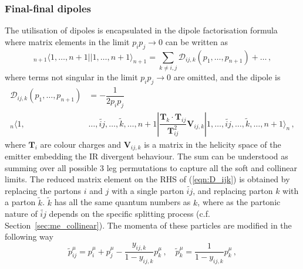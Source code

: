 \documentclass[main.tex]{subfiles}
\begin{document}
    \subsubsection{Final-final dipoles}
        The utilisation of dipoles is encapsulated in the
        dipole factorisation formula where matrix elements in the limit
        $p_{i}p_{j} \rightarrow 0$ can be written as
        \begin{equation}\label{eqn:FF_factorisation}
            {}_{n+1} \langle 1, \ldots, n+1 | | 1, \ldots, n+1 \rangle_{n+1} = \sum_{k\neq i,j}\mathcal{D}_{ij,k}(p_{1},\ldots,p_{n+1}) + \ldots \, ,
        \end{equation}
        where terms not singular in the limit $p_{i}p_{j} \rightarrow 0$
        are omitted, and the dipole is
        \begin{equation}\label{eqn:D_ijk}
            \begin{split}
                \mathcal{D}_{ij,k}(p_{1},\ldots,p_{n+1}) &= -\dfrac{1}{2p_{i}p_{j}} \\
                {}_{n}\langle 1, &\ldots, \widetilde{ij}, \ldots, \tilde{k}, \ldots, n+1 | \dfrac{\boldsymbol{T}_{k} \cdot \boldsymbol{T}_{ij}}{\boldsymbol{T}_{ij}^{2}} \boldsymbol{V}_{ij,k} | 1, \ldots, \widetilde{ij}, \ldots, \tilde{k}, \ldots, n+1 \rangle_{n} \, ,
            \end{split}
        \end{equation}
        where $\boldsymbol{T}_{i}$ are colour charges and $\boldsymbol{V}_{ij,k}$
        is a matrix in the helicity space of the emitter embedding the
        IR divergent behaviour.
        The sum can be understood as summing over all possible
        3 leg permutations to capture all the soft and collinear limits.
        The reduced matrix element on the RHS of (\ref{eqn:D_ijk})
        is obtained by replacing the partons $i$ and $j$ with
        a single parton $\widetilde{ij}$, and replacing parton
        $k$ with a parton $\tilde{k}$. $\tilde{k}$ has all the
        same quantum numbers as $k$, where as the
        partonic nature of $\widetilde{ij}$ depends on
        the specific splitting process (c.f. Section~\ref{sec:me_collinear}).
        The momenta of these particles are modified in the following way
        \begin{equation}\label{eqn:FF_mapping}
            \tilde{p}_{ij}^{\mu} = p_{i}^{\mu} + p_{j}^{\mu} - \dfrac{y_{ij,k}}{1-y_{ij,k}} p_{k}^{\mu} \, , \quad \tilde{p}_{k}^{\mu} = \dfrac{1}{1-y_{ij,k}}p_{k}^{\mu} \, ,
        \end{equation}
\end{document}

